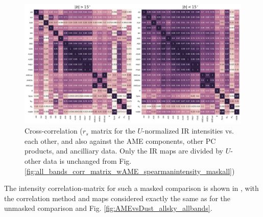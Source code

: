             \begin{figure}
              \includegraphics[width=\textwidth]{../Plots/ch_allsky/all_bands_corr_matrix_wAME_spearmanU_norm_masked.pdf}
              \centering
              \caption{Cross-correlation ($r_{s}$ matrix for the $U$-normalized IR intensities vs. each other, and also against the AME components, other PC products, and ancilliary data. Only the IR maps are divided by $U$- other data is unchanged from Fig. \ref{fig:all_bands_corr_matrix_wAME_spearmanintensity_maskall})}
              \label{fig:all_bands_corr_matrix_wAME_spearmanU_norm_masked}
            \end{figure}

        The intensity correlation-matrix for such a masked comparison is shown in , with the correlation method and maps considered exactly the same as for the unmasked comparison and Fig. \ref{fig:AMEvsDust_allsky_allbands}.

